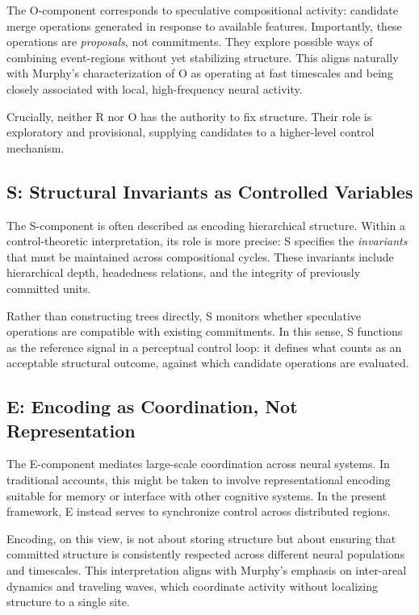 \documentclass[11pt]{article}
\begin{document}
The O-component corresponds to speculative compositional activity: candidate merge operations generated in response to available features. Importantly, these operations are \emph{proposals}, not commitments. They explore possible ways of combining event-regions without yet stabilizing structure. This aligns naturally with Murphy’s characterization of O as operating at fast timescales and being closely associated with local, high-frequency neural activity.

Crucially, neither R nor O has the authority to fix structure. Their role is exploratory and provisional, supplying candidates to a higher-level control mechanism.

\subsection{S: Structural Invariants as Controlled Variables}

The S-component is often described as encoding hierarchical structure. Within a control-theoretic interpretation, its role is more precise: S specifies the \emph{invariants} that must be maintained across compositional cycles. These invariants include hierarchical depth, headedness relations, and the integrity of previously committed units.

Rather than constructing trees directly, S monitors whether speculative operations are compatible with existing commitments. In this sense, S functions as the reference signal in a perceptual control loop: it defines what counts as an acceptable structural outcome, against which candidate operations are evaluated.

\subsection{E: Encoding as Coordination, Not Representation}

The E-component mediates large-scale coordination across neural systems. In traditional accounts, this might be taken to involve representational encoding suitable for memory or interface with other cognitive systems. In the present framework, E instead serves to synchronize control across distributed regions.

Encoding, on this view, is not about storing structure but about ensuring that committed structure is consistently respected across different neural populations and timescales. This interpretation aligns with Murphy’s emphasis on inter-areal dynamics and traveling waves, which coordinate activity without localizing structure to a single site.
\end{document}

